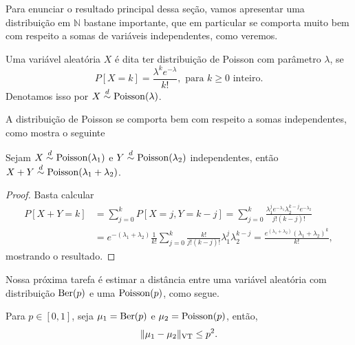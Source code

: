 \begin{topics}
Para enunciar o resultado principal dessa seção, vamos apresentar uma distribuição em $\mathbb{N}$ bastane importante, que em particular se comporta muito bem com respeito a somas de variáveis independentes, como veremos.

\begin{definition}
  Uma variável aleatória $X$ é dita ter distribuição de Poisson  com parâmetro $\lambda$, se
  \begin{equation}
    P[X = k] = \frac{\lambda^k e^{-\lambda}}{k!}, \text{ para $k \geq 0$ inteiro.}
  \end{equation}
  Denotamos isso por $X \overset{d}\sim \operatorname{Poisson}(\lambda)$.
\end{definition}

A distribuição de Poisson se comporta bem com respeito a somas independentes, como mostra o seguinte
\begin{lemma}
\label{l:soma_poisson}
Sejam $X \overset{d}\sim \operatorname{Poisson}(\lambda_1)$ e $Y \overset{d}\sim \operatorname{Poisson}(\lambda_2)$ independentes, então $X+Y \overset{d}\sim \operatorname{Poisson}(\lambda_1 + \lambda_2)$.
\end{lemma}

\begin{proof}
Basta calcular
\begin{equation}
  \begin{split}
    P[X+Y = k] & = \sum_{j = 0}^k P[X = j, Y = k-j] = \sum_{j = 0}^k \frac{\lambda_1^j e^{-\lambda_1} \lambda_2^{k-j} e^{-\lambda_2}}{j! (k-j)!}\\
    & = e^{-(\lambda_1 + \lambda_2)} \frac{1}{k!} \sum_{j = 0}^k \frac{k!}{j! (k-j)!} \lambda_1^j \lambda_2^{k-j} = \frac{e^{(\lambda_1 + \lambda_2)} (\lambda_1 + \lambda_2)^k}{k!},
  \end{split}
\end{equation}
mostrando o resultado.
\end{proof}

Nossa próxima tarefa é estimar a distância entre uma variável aleatória com distribuição $\operatorname{Ber}(p)$ e uma $\operatorname{Poisson}(p)$, como segue.

\begin{lemma}
\label{l:vt_ber_poiss}
Para $p \in [0,1]$, seja $\mu_1 = \operatorname{Ber}(p)$ e $\mu_2 = \operatorname{Poisson}(p)$, então,
\begin{equation}
  \lVert \mu_1 - \mu_2 \rVert_{\operatorname{VT}} \leq p^2.
\end{equation}
\end{lemma}


\end{topics}
